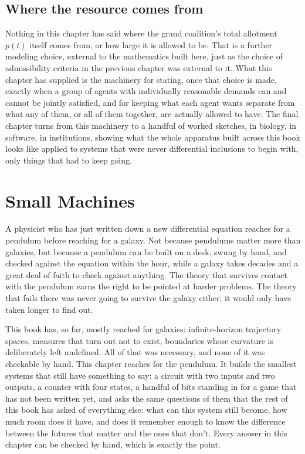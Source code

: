 \documentclass[11pt]{report}
\begin{document}
\section*{Where the resource comes from}

Nothing in this chapter has said where the grand coalition's total
allotment $p(t)$ itself comes from, or how large it is allowed to be.
That is a further modeling choice, external to the mathematics
built here, just as the choice of admissibility criteria in the
previous chapter was external to it. What this chapter has supplied is
the machinery for stating, once that choice is made, exactly when a
group of agents with individually reasonable demands can and cannot be
jointly satisfied, and for keeping what each agent wants separate from
what any of them, or all of them together, are actually allowed to
have. The final chapter turns from this machinery to a handful of
worked sketches, in biology, in software, in institutions, showing
what the whole apparatus built across this book looks like applied to
systems that were never differential inclusions to begin with, only
things that had to keep going.

\chapter{Small Machines}

A physicist who has just written down a new differential equation
reaches for a pendulum before reaching for a galaxy. Not because
pendulums matter more than galaxies, but because a pendulum can be
built on a desk, swung by hand, and checked against the equation
within the hour, while a galaxy takes decades and a great deal of
faith to check against anything. The theory that survives contact with
the pendulum earns the right to be pointed at harder problems. The
theory that fails there was never going to survive the galaxy either;
it would only have taken longer to find out.

This book has, so far, mostly reached for galaxies: infinite-horizon
trajectory spaces, measures that turn out not to exist, boundaries
whose curvature is deliberately left undefined. All of that was
necessary, and none of it was checkable by hand. This chapter reaches
for the pendulum. It builds the smallest systems that still have
something to say: a circuit with two inputs and two outputs, a
counter with four states, a handful of bits standing in for a game
that has not been written yet, and asks the same questions of them
that the rest of this book has asked of everything else: what can this
system still become, how much room does it have, and does it remember
enough to know the difference between the futures that matter and the
ones that don't. Every answer in this chapter can be checked by hand,
which is exactly the point.
\end{document}
